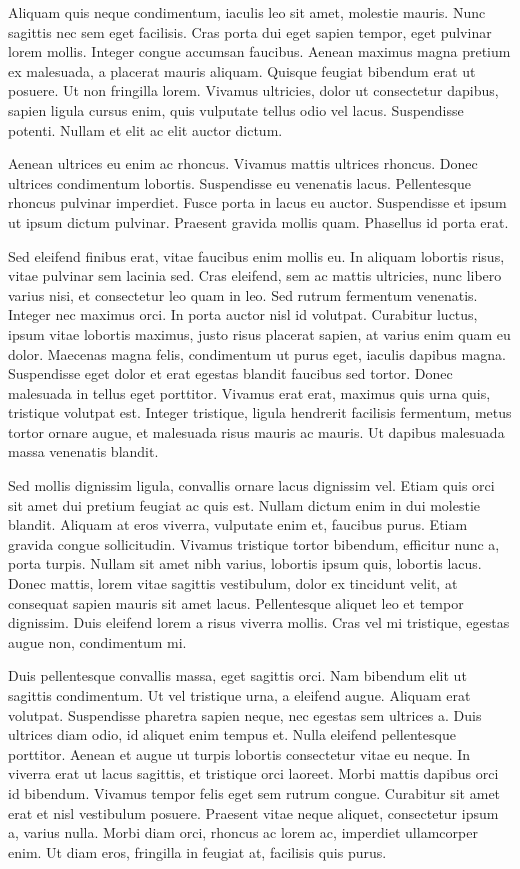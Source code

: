 \documentclass[a4paper, 12pt]{article}
\begin{document}
	Aliquam quis neque condimentum, iaculis leo sit amet, molestie mauris. Nunc sagittis nec sem eget facilisis. Cras porta dui eget sapien tempor, eget pulvinar lorem mollis. Integer congue accumsan faucibus. Aenean maximus magna pretium ex malesuada, a placerat mauris aliquam. Quisque feugiat bibendum erat ut posuere. Ut non fringilla lorem. Vivamus ultricies, dolor ut consectetur dapibus, sapien ligula cursus enim, quis vulputate tellus odio vel lacus. Suspendisse potenti. Nullam et elit ac elit auctor dictum.
	
	Aenean ultrices eu enim ac rhoncus. Vivamus mattis ultrices rhoncus. Donec ultrices condimentum lobortis. Suspendisse eu venenatis lacus. Pellentesque rhoncus pulvinar imperdiet. Fusce porta in lacus eu auctor. Suspendisse et ipsum ut ipsum dictum pulvinar. Praesent gravida mollis quam. Phasellus id porta erat.
	
	Sed eleifend finibus erat, vitae faucibus enim mollis eu. In aliquam lobortis risus, vitae pulvinar sem lacinia sed. Cras eleifend, sem ac mattis ultricies, nunc libero varius nisi, et consectetur leo quam in leo. Sed rutrum fermentum venenatis. Integer nec maximus orci. In porta auctor nisl id volutpat. Curabitur luctus, ipsum vitae lobortis maximus, justo risus placerat sapien, at varius enim quam eu dolor. Maecenas magna felis, condimentum ut purus eget, iaculis dapibus magna. Suspendisse eget dolor et erat egestas blandit faucibus sed tortor. Donec malesuada in tellus eget porttitor. Vivamus erat erat, maximus quis urna quis, tristique volutpat est. Integer tristique, ligula hendrerit facilisis fermentum, metus tortor ornare augue, et malesuada risus mauris ac mauris. Ut dapibus malesuada massa venenatis blandit.
	
	Sed mollis dignissim ligula, convallis ornare lacus dignissim vel. Etiam quis orci sit amet dui pretium feugiat ac quis est. Nullam dictum enim in dui molestie blandit. Aliquam at eros viverra, vulputate enim et, faucibus purus. Etiam gravida congue sollicitudin. Vivamus tristique tortor bibendum, efficitur nunc a, porta turpis. Nullam sit amet nibh varius, lobortis ipsum quis, lobortis lacus. Donec mattis, lorem vitae sagittis vestibulum, dolor ex tincidunt velit, at consequat sapien mauris sit amet lacus. Pellentesque aliquet leo et tempor dignissim. Duis eleifend lorem a risus viverra mollis. Cras vel mi tristique, egestas augue non, condimentum mi.
	
	Duis pellentesque convallis massa, eget sagittis orci. Nam bibendum elit ut sagittis condimentum. Ut vel tristique urna, a eleifend augue. Aliquam erat volutpat. Suspendisse pharetra sapien neque, nec egestas sem ultrices a. Duis ultrices diam odio, id aliquet enim tempus et. Nulla eleifend pellentesque porttitor. Aenean et augue ut turpis lobortis consectetur vitae eu neque. In viverra erat ut lacus sagittis, et tristique orci laoreet. Morbi mattis dapibus orci id bibendum. Vivamus tempor felis eget sem rutrum congue. Curabitur sit amet erat et nisl vestibulum posuere. Praesent vitae neque aliquet, consectetur ipsum a, varius nulla. Morbi diam orci, rhoncus ac lorem ac, imperdiet ullamcorper enim. Ut diam eros, fringilla in feugiat at, facilisis quis purus.
	
\end{document}
